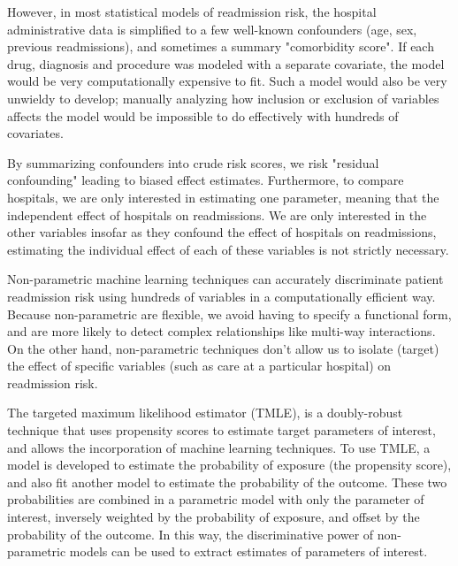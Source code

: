 \documentclass[]{article}\usepackage[]{graphicx}\usepackage[]{color}
\begin{document}
However, in most statistical models of readmission risk, the hospital administrative data is simplified to a few well-known confounders (age, sex, previous readmissions), and sometimes a summary "comorbidity score".\supercite{kansagara_risk_2011} If each drug, diagnosis and procedure was modeled with a separate covariate, the model would be very computationally expensive to fit. Such a model would also be very unwieldy to develop; manually analyzing how inclusion or exclusion of variables affects the model would be impossible to do effectively with hundreds of covariates.

By summarizing confounders into crude risk scores, we risk "residual confounding" leading to biased effect estimates. Furthermore, to compare hospitals, we are only interested in estimating one parameter, meaning that the independent effect of hospitals on readmissions. We are only interested in the other variables insofar as they confound the effect of hospitals on readmissions, estimating the individual effect of each of these variables is not strictly necessary.

Non-parametric machine learning techniques can accurately discriminate patient readmission risk using hundreds of variables in a computationally efficient way.\supercite{friedman_regularization_2010} Because non-parametric are flexible, we avoid having to specify a functional form, and are more likely to detect complex relationships like multi-way interactions. On the other hand, non-parametric techniques don't allow us to isolate (target) the effect of specific variables (such as care at a particular hospital) on readmission risk.

The targeted maximum likelihood estimator (TMLE), is a doubly-robust technique that uses propensity scores to estimate target parameters of interest, and allows the incorporation of machine learning techniques.\supercite{van_der_laan_targeted_2011} To use TMLE, a model is developed to estimate the probability of exposure (the propensity score), and also fit another model to estimate the probability of the outcome. These two probabilities are combined in a parametric model with only the parameter of interest, inversely weighted by the probability of exposure, and offset by the probability of the outcome. In this way, the discriminative power of non-parametric models can be used to extract estimates of parameters of interest.
\end{document}
